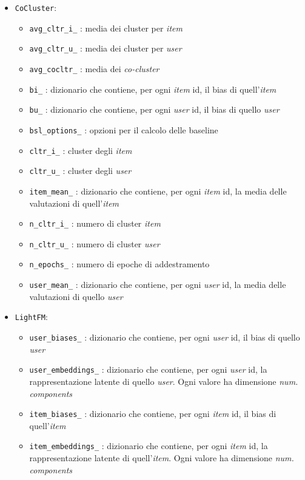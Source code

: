 \begin{itemize}
\begin{itemize}
    \end{itemize}
    \item \texttt{CoCluster}:
    \begin{itemize}
        \item \texttt{avg\_cltr\_i\_} : media dei cluster per \textit{item}
        \item \texttt{avg\_cltr\_u\_} : media dei cluster per \textit{user}
        \item \texttt{avg\_cocltr\_} : media dei \textit{co-cluster}
        \item \texttt{bi\_} : dizionario che contiene, per ogni \textit{item} id, il bias di quell'\textit{item}
        \item \texttt{bu\_} : dizionario che contiene, per ogni \textit{user} id, il bias di quello \textit{user}
        \item \texttt{bsl\_options\_} : opzioni per il calcolo delle baseline
        \item \texttt{cltr\_i\_} : cluster degli \textit{item}
        \item \texttt{cltr\_u\_} : cluster degli \textit{user}
        \item \texttt{item\_mean\_} : dizionario che contiene, per ogni \textit{item} id, la media delle valutazioni di quell'\textit{item}
        \item \texttt{n\_cltr\_i\_} : numero di cluster \textit{item}
        \item \texttt{n\_cltr\_u\_} : numero di cluster \textit{user}
        \item \texttt{n\_epochs\_} : numero di epoche di addestramento
        \item \texttt{user\_mean\_} : dizionario che contiene, per ogni \textit{user} id, la media delle valutazioni di quello \textit{user}
    \end{itemize}
    \item \texttt{LightFM}:
    \begin{itemize}
        \item \texttt{user\_biases\_} : dizionario che contiene, per ogni \textit{user} id, il bias di quello \textit{user}
        \item \texttt{user\_embeddings\_} : dizionario che contiene, per ogni \textit{user} id, la rappresentazione latente di quello \textit{user}. Ogni valore ha dimensione \textit{num. components}
        \item \texttt{item\_biases\_} : dizionario che contiene, per ogni \textit{item} id, il bias di quell'\textit{item}
        \item \texttt{item\_embeddings\_} : dizionario che contiene, per ogni \textit{item} id, la rappresentazione latente di quell'\textit{item}. Ogni valore ha dimensione \textit{num. components}
    \end{itemize}



\end{itemize}
